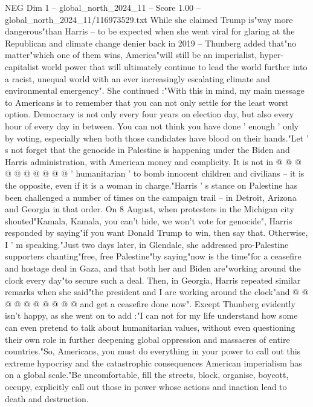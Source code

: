 \begin{textsample}{NEG Dim 1 – global\_north\_2024\_11 – Score 1.00 – global\_north\_2024\_11/116973529.txt}  \label{ex:f1_neg_220}
While she claimed Trump is"way more dangerous"than Harris -- to be expected when she went viral for glaring at the Republican and climate change denier back in 2019 -- Thunberg added that"no matter"which one of them wins, America"will still be an imperialist, hyper-capitalist world power that will ultimately continue to lead the world further into a racist, unequal world with an ever increasingly escalating climate and environmental emergency".
She continued :"With this in mind, my main message to Americans is to remember that you can not only settle for the least worst option.
Democracy is not only every four years on election day, but also every hour of every day in between.
You can not think you have done ' enough ' only by voting, especially when both those candidates have blood on their hands."Let ' s not forget that the genocide in Palestine is happening under the Biden and Harris administration, with American money and complicity.
It is not in @ @ @ @ @ @ @ @ @ @ ' humanitarian ' to bomb innocent children and civilians -- it is the opposite, even if it is a woman in charge."Harris ' s stance on Palestine has been challenged a number of times on the campaign trail -- in Detroit, Arizona and Georgia in that order.
On 8 August, when protesters in the Michigan city shouted"Kamala, Kamala, you can't hide, we won't vote for genocide", Harris responded by saying"if you want Donald Trump to win, then say that.
Otherwise, I ' m speaking."Just two days later, in Glendale, she addressed pro-Palestine supporters chanting"free, free Palestine"by saying"now is the time"for a ceasefire and hostage deal in Gaza, and that both her and Biden are"working around the clock every day"to secure such a deal.
Then, in Georgia, Harris repeated similar remarks when she said"the president and I are working around the clock"and @ @ @ @ @ @ @ @ @ @ and get a ceasefire done now".
Except Thunberg evidently isn't happy, as she went on to add :"I can not for my life understand how some can even pretend to talk about humanitarian values, without even questioning their own role in further deepening global oppression and massacres of entire countries."So, Americans, you must do everything in your power to call out this extreme hypocrisy and the catastrophic consequences American imperialism has on a global scale."Be uncomfortable, fill the streets, block, organise, boycott, occupy, explicitly call out those in power whose actions and inaction lead to death and destruction.

\end{textsample}
